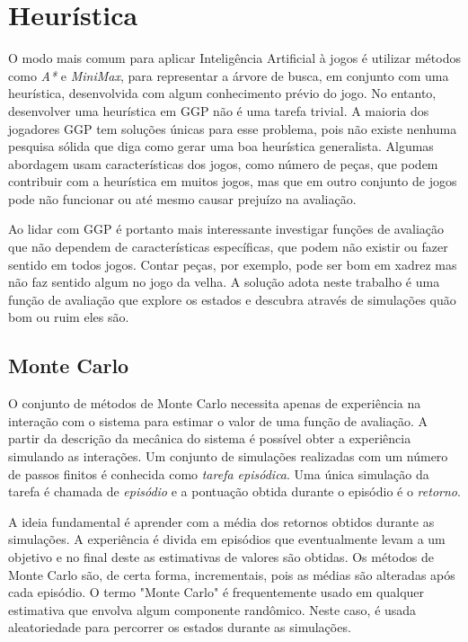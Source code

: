 \chapter{Heurística}
O modo mais comum para aplicar Inteligência Artificial à jogos é utilizar métodos como \textit{A*} e \textit{MiniMax}, para representar a árvore de busca, em conjunto com uma heurística, desenvolvida com algum conhecimento prévio do jogo. No entanto, desenvolver uma heurística em GGP não é uma tarefa trivial. A maioria dos jogadores GGP tem soluções únicas para esse problema, pois não existe nenhuma pesquisa sólida que diga como gerar uma boa heurística generalista. Algumas abordagem usam características dos jogos, como número de peças, que podem contribuir com a heurística em muitos jogos, mas que em outro conjunto de jogos pode não funcionar ou até mesmo causar prejuízo na avaliação.

Ao lidar com GGP é portanto mais interessante investigar funções de avaliação que não dependem de características específicas, que podem não existir ou fazer sentido em todos jogos. Contar peças, por exemplo, pode ser bom em xadrez mas não faz sentido algum no jogo da velha. A solução adota neste trabalho é uma função de avaliação que explore os estados e descubra através de simulações quão bom ou ruim eles são.


\section{Monte Carlo}
O conjunto de métodos de Monte Carlo\cite{rlearning} necessita apenas de experiência na interação com o sistema para estimar o valor de uma função de avaliação. A partir da descrição da mecânica do sistema é possível obter a experiência simulando as interações. Um  conjunto de simulações realizadas com um número de passos finitos é conhecida como \textit{tarefa episódica}. Uma única simulação da tarefa é chamada de \textit{episódio} e a pontuação obtida durante o episódio é o \textit{retorno}. 

A ideia fundamental é aprender com a média dos retornos obtidos durante as simulações. A experiência é divida em episódios que eventualmente levam a um objetivo e no final deste as estimativas de valores são obtidas. Os métodos de Monte Carlo são, de certa forma, incrementais, pois as médias são alteradas após cada episódio. O termo "Monte Carlo" é frequentemente usado em qualquer estimativa que envolva algum componente randômico. Neste caso, é usada aleatoriedade para percorrer os estados durante as simulações.

